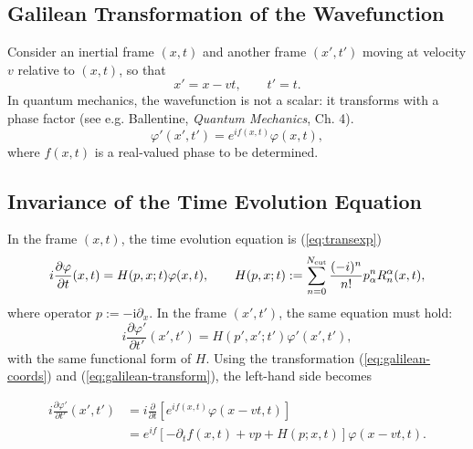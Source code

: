\documentclass{book}
\newcommand{\assign}{:=}
\newcommand{\mathi}{\mathrm{i}}
\newcommand{\tmem}[1]{{\em #1\/}}
\newcommand{\tmop}[1]{\ensuremath{\operatorname{#1}}}
\begin{document}
\subsection{Galilean Transformation of the Wavefunction}

Consider an inertial frame $(x, t)$ and another frame
$(x', t')$ moving at velocity $v$ relative to $(x,t)$, so that
\begin{equation}
  x' = x - vt, \qquad t' = t. \label{eq:galilean-coords}
\end{equation}
In quantum mechanics, the wavefunction is not a scalar: it transforms with a
phase factor (see e.g. Ballentine, {\tmem{Quantum Mechanics}}, Ch. 4).
\begin{equation}
  \varphi' (x', t') = e^{if (x, t)} \varphi (x, t),
  \label{eq:galilean-transform}
\end{equation}
where $f (x, t)$ is a real-valued phase to be determined.

\subsection{Invariance of the Time Evolution Equation}

In the frame $(x,t)$, the time evolution equation is (\ref{eq:transexp})
\[ i \frac{\partial \varphi}{\partial t}  (x, t) = H (p, x ; t) \varphi (x,
   t), \qquad H (p, x ; t) \assign \sum_{n = 0}^{N_{\tmop{cut}}} \frac{(-
   i)^n}{n!}
   p_{\alpha}^n {\color[HTML]{000000}R^{\alpha}_n  (x, t)} , \]
where operator $p \assign - \mathi \partial_x$. In the frame $(x',t')$, the same
equation must hold:
\[ i \frac{\partial \varphi'}{\partial t'}  (x', t') = H (p', x' ; t')
   \varphi' (x', t'), \]
with the same functional form of $H$. Using the transformation
(\ref{eq:galilean-coords}) and (\ref{eq:galilean-transform}), the left-hand
side becomes

\begin{align}
  i \frac{\partial \varphi'}{\partial t'}  (x', t') & = i
  \frac{\partial}{\partial t}  [e^{if (x, t)} \varphi (x - vt, t)] \nonumber\\
  & = e^{if}  [- \partial_t f (x, t) + vp + H (p ; x, t)] \varphi (x - vt, t)
  . 
\end{align}
\end{document}
